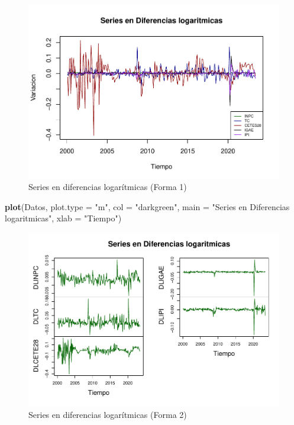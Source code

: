 \documentclass[
]{book}
\newenvironment{Shaded}{\begin{snugshade}}{\end{snugshade}}
\newcommand{\AttributeTok}[1]{\textcolor[rgb]{0.13,0.29,0.53}{#1}}
\newcommand{\FunctionTok}[1]{\textcolor[rgb]{0.13,0.29,0.53}{\textbf{#1}}}
\newcommand{\NormalTok}[1]{#1}
\newcommand{\StringTok}[1]{\textcolor[rgb]{0.31,0.60,0.02}{#1}}
\begin{document}
\begin{figure}

{\centering \includegraphics{Notas-Series-Tiempo_files/figure-latex/fig62-1} 

}

\caption{Series en diferencias logarítmicas (Forma 1)}\label{fig:fig62}
\end{figure}

\begin{Shaded}
\begin{Highlighting}[]
\FunctionTok{plot}\NormalTok{(Datos, }\AttributeTok{plot.type =} \StringTok{"m"}\NormalTok{, }
     \AttributeTok{col =} \StringTok{"darkgreen"}\NormalTok{, }
     \AttributeTok{main =} \StringTok{"Series en Diferencias logaritmicas"}\NormalTok{, }\AttributeTok{xlab =} \StringTok{"Tiempo"}\NormalTok{)}
\end{Highlighting}
\end{Shaded}

\begin{figure}

{\centering \includegraphics{Notas-Series-Tiempo_files/figure-latex/fig63-1} 

}

\caption{Series en diferencias logarítmicas (Forma 2)}\label{fig:fig63}
\end{figure}
\end{document}
